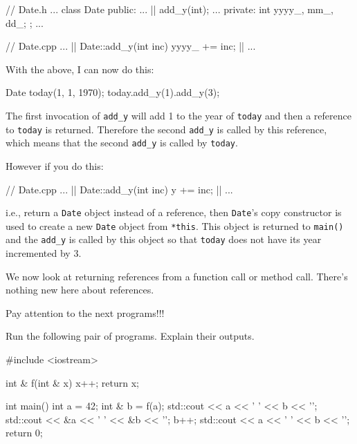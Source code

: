 \begin{consolethree}[escapeinside=||]
// Date.h
...
class Date
{
public:
    ...
    || add_y(int);
    ...
private:
    int yyyy_, mm_, dd_;
};
...
\end{consolethree}

\begin{consolethree}[escapeinside=||]
// Date.cpp
...
|| Date::add_y(int inc)
{
    yyyy_ += inc;
    ||
}
...
\end{consolethree}

With the above, I can now do this:

\begin{consolethree}[escapeinside=||]
Date today(1, 1, 1970);
today.add_y(1).add_y(3);
\end{consolethree}

The first invocation of \texttt{add\_y} will add 1 to the year of
\texttt{today} and then a reference to \texttt{today} is returned. Therefore
the second \texttt{add\_y} is called by this reference, which means that
the second \texttt{add\_y} is called by \texttt{today}.

However if you do this:

\begin{consolethree}[escapeinside=||]
// Date.cpp
...
|| Date::add_y(int inc)
{
    y += inc;
    ||
}
...
\end{consolethree}

i.e., return a \texttt{Date} object instead of a reference, then
\texttt{Date}'s copy constructor is used to create a new
\texttt{Date} object from \texttt{*this}. This object is returned to
\texttt{main()} and the \texttt{add\_y} is called by this object so that
\texttt{today} does not have its year incremented by 3.

We now look at returning references from a function call or method call.
There's nothing new here about references.

 Pay attention to the next programs!!!

Run the following pair of programs. Explain their outputs.

\begin{consolethree}[escapeinside=||]
#include <iostream>

int & f(int & x)
{
    x++;
    return x;
}

int main()
{
    int a = 42;
    int & b = f(a);
    std::cout << a << ' ' << b << '\n';
    std::cout << &a << ' ' << &b << '\n';
    b++;
    std::cout << a << ' ' << b << '\n';
    return 0;
}
\end{consolethree}

